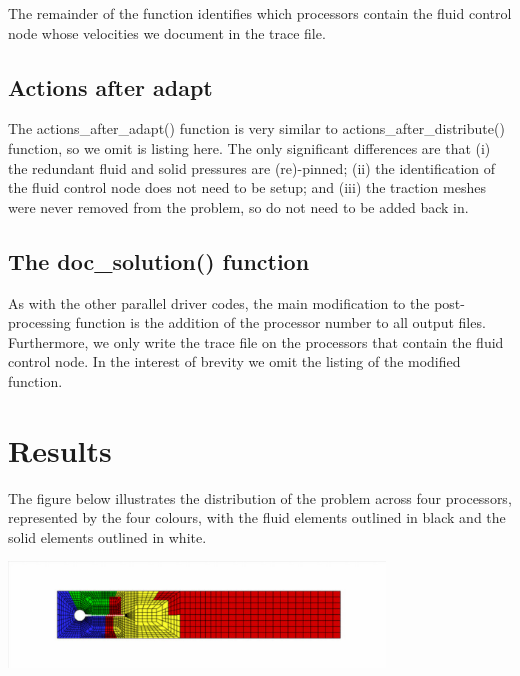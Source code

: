 The remainder of the function identifies which processors contain the fluid control node whose velocities we document in the trace file.



\hypertarget{index_actions_after_adapt}{}\subsection{Actions after adapt}\label{index_actions_after_adapt}
The {\ttfamily actions\+\_\+after\+\_\+adapt()} function is very similar to {\ttfamily actions\+\_\+after\+\_\+distribute()} function, so we omit is listing here. The only significant differences are that (i) the redundant fluid and solid pressures are (re)-\/pinned; (ii) the identification of the fluid control node does not need to be setup; and (iii) the traction meshes were never removed from the problem, so do not need to be added back in.



\hypertarget{index_doc_solution}{}\subsection{The doc\+\_\+solution() function}\label{index_doc_solution}
As with the other parallel driver codes, the main modification to the post-\/processing function is the addition of the processor number to all output files. Furthermore, we only write the trace file on the processors that contain the fluid control node. In the interest of brevity we omit the listing of the modified function.



 

\hypertarget{index_result}{}\section{Results}\label{index_result}
The figure below illustrates the distribution of the problem across four processors, represented by the four colours, with the fluid elements outlined in black and the solid elements outlined in white.

 
\begin{DoxyImage}
\includegraphics[width=0.75\textwidth]{turek_partition}
\end{DoxyImage}


